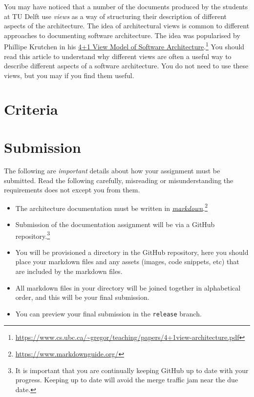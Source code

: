 \documentclass{csse4400}
\begin{document}
You may have noticed that a number of the documents produced by the students at TU Delft use \textsl{views} 
as a way of structuring their description of different aspects of the architecture. The idea of architectural views
is common to different approaches to documenting software architecture. The idea was popularised by Phillipe 
Krutchen in his \href{https://www.cs.ubc.ca/~gregor/teaching/papers/4+1view-architecture.pdf}
{4+1 View Model of Software Architecture}.\footnote{\url{https://www.cs.ubc.ca/~gregor/teaching/papers/4+1view-architecture.pdf}}
You should read this article to understand why different views are often a useful way to describe different
aspects of a software architecture. You do not need to use these views, but you may if you find them useful.

\section{Criteria}

\section{Submission}
The following are \textsl{important} details about how your assignment must be submitted.
Read the following carefully, misreading or misunderstanding the requirements does not except you from them.

\begin{itemize}
    \item The architecture documentation must be written in \href{https://www.markdownguide.org/}{\textsl{markdown}}.\footnote{\url{https://www.markdownguide.org/}}
    \item Submission of the documentation assignment will be via a GitHub repository.\footnote{It is important that you are continually keeping GitHub up to date with your progress.
        Keeping up to date will avoid the merge traffic jam near the due date.}
    \item You will be provisioned a directory in the GitHub repository,
        here you should place your markdown files and any assets (images, code snippets, etc) that are included by the markdown files.
    \item All markdown files in your directory will be joined together in alphabetical order,
        and this will be your final submission.
    \item You can preview your final submission in the \texttt{release} branch.
\end{itemize}
\end{document}
